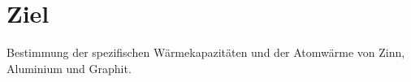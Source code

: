 \section{Ziel}
\label{sec:ziel}

Bestimmung der spezifischen Wärmekapazitäten und der Atomwärme von Zinn, Aluminium und Graphit.